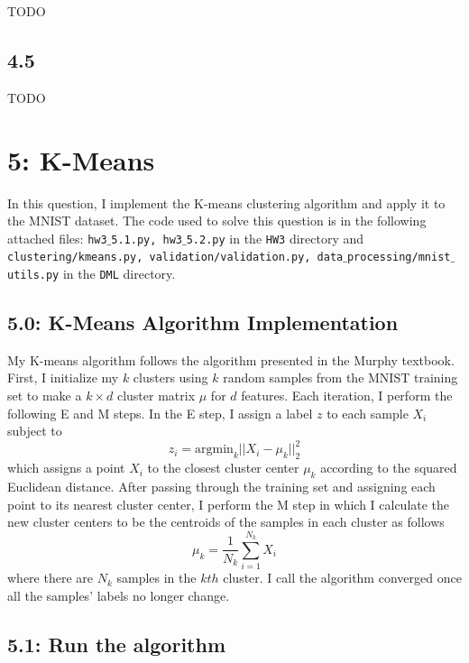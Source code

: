 \documentclass[12pt]{amsart}
\begin{document}
TODO

\subsection*{4.5}

TODO

\section*{5: K-Means}

In this question, I implement the K-means clustering algorithm and apply it to the MNIST dataset.  The code used to solve this question is in the following attached files: {\tt hw3$\_$5.1.py, hw3$\_$5.2.py} in the {\tt HW3} directory and {\tt clustering/kmeans.py, validation/validation.py, data$\_$processing/mnist$\_$utils.py} in the {\tt DML} directory.

\subsection*{5.0: K-Means Algorithm Implementation}

My K-means algorithm follows the algorithm presented in the Murphy textbook.  First, I initialize my $k$ clusters using $k$ random samples from the MNIST training set to make a $k \times d$ cluster matrix $\mu$ for $d$ features.  Each iteration, I perform the following E and M steps.  In the E step, I assign a label $z$ to each sample $X_i$ subject to
\begin{equation} \label{eqn:E_step}
z_i = \text{argmin}_k ||X_i - \mu_k ||_2^2
\end{equation}
which assigns a point $X_i$ to the closest cluster center $\mu_k$ according to the squared Euclidean distance.  After passing through the training set and assigning each point to its nearest cluster center, I perform the M step in which I calculate the new cluster centers to be the centroids of the samples in each cluster as follows
\begin{equation} \label{eqn:M_step}
\mu_k = \frac{1}{N_k} \sum_{i = 1}^{N_k} X_i
\end{equation}
where there are $N_k$ samples in the $kth$ cluster.  I call the algorithm converged once all the samples' labels no longer change.

\subsection*{5.1: Run the algorithm}
\end{document}
